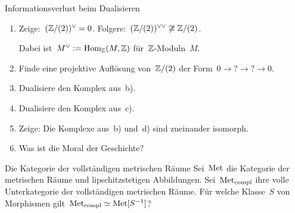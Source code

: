 \documentclass{uebblatt}
\begin{document}

\begin{aufgabe}{Informationsverlust beim Dualisieren}
\begin{enumerate}
\item Zeige:~$(\mathbb{Z}/(2))^\vee = 0$.
Folgere:~$(\mathbb{Z}/(2))^{\vee\vee} \not\cong \mathbb{Z}/(2)$.

Dabei ist~$M^\vee \vcentcolon= \mathrm{Hom}_{\mathbb{Z}}(M,\mathbb{Z})$ für~$\mathbb{Z}$-Moduln~$M$.
\item Finde eine projektive Auflösung von~$\mathbb{Z}/(2)$ der Form~$0 \to {?} \to {?} \to
0$.
\item Dualisiere den Komplex aus~b).
\item Dualisiere den Komplex aus~c).
\item Zeige: Die Komplexe aus~b) und~d) sind zueinander isomorph.
\item Was ist die Moral der Geschichte?
\end{enumerate}
\end{aufgabe}

\begin{aufgabe}{Die Kategorie der vollständigen metrischen Räume}
Sei~$\mathrm{Met}$ die Kategorie der metrischen Räume und lipschitzstetigen
Abbildungen. Sei~$\mathrm{Met}_\mathrm{compl}$ ihre volle Unterkategorie der
vollständigen metrischen Räume. Für welche Klasse~$S$ von Morphismen
gilt~$\mathrm{Met}_\mathrm{compl} \simeq \mathrm{Met}[S^{-1}]$?

\end{aufgabe}

\end{document}
